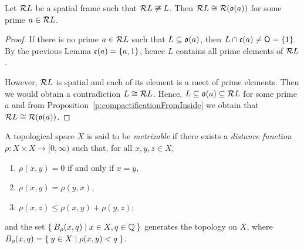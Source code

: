 \begin{proposition}\label{p:spatialCompactifAndPrime}
    Let $\mathcal{R} L$ be a spatial frame such that $\mathcal{R} L\not\cong L$. Then $\mathcal{R} L\cong \mathcal{R}(\mathfrak{o}(a))$ for some prime $a\in \mathcal{R} L$.
\end{proposition}
\begin{proof}
    If there is no prime $a\in\mathcal{R} L$ such that $L\subseteq \mathfrak{o}(a)$, then $L\cap \mathfrak{c}(a)\neq \mathsf{O} = \{1\}$. By the previous Lemma $\mathfrak{c}(a) = \{a,1\}$, hence $L$ contains all prime elements of $\mathcal{R} L$.

    However, $\mathcal{R} L$ is spatial and each of its element is a meet of prime elements. Then we would obtain a contradiction $L\cong \mathcal{R} L$. Hence, $L\subseteq \mathfrak{o}(a)\subseteq \mathcal{R} L$ for some prime $a$ and from Proposition~\ref{p:compactificationFromInside} we obtain that $\mathcal{R} L\cong \mathcal{R}(\mathfrak{o}(a))$.
\end{proof}

\begin{definition}
    A topological space $X$ is said to be \emph{metrizable} if there exists a \emph{distance function} $\rho\colon X\times X\to [0,\infty)$ such that, for all $x,y,z\in X$,
    \begin{enumerate}[(M1)]
        \item $\rho(x,y) = 0$ if and only if $x = y$,
        \item $\rho(x,y) = \rho(y,x)$,
        \item $\rho(x,z) \leq \rho(x,y) + \rho(y,z)$;
    \end{enumerate}

    \noindent and the set $\Set{ B_\rho(x,q) | x\in X, q\in \mathbb Q}$ generates the topology on $X$, where $B_\rho(x,q) = \Set{ y \in X | \rho(x,y) < q}$.
\end{definition}

